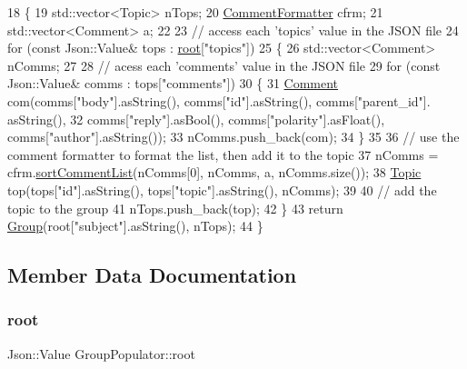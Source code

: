 \begin{DoxyCode}
18 \{
19     std::vector<Topic> nTops;
20     \hyperlink{class_comment_formatter}{CommentFormatter} cfrm;
21     std::vector<Comment> a;
22 
23     \textcolor{comment}{// access each 'topics' value in the JSON file}
24     \textcolor{keywordflow}{for} (\textcolor{keyword}{const} Json::Value& tops : \hyperlink{class_group_populator_a161f0427ec538d3a99da2e53fdbc9b2b}{root}[\textcolor{stringliteral}{"topics"}])
25     \{
26         std::vector<Comment> nComms;
27 
28         \textcolor{comment}{// acess each 'comments' value in the JSON file}
29         \textcolor{keywordflow}{for} (\textcolor{keyword}{const} Json::Value& comms : tops[\textcolor{stringliteral}{"comments"}])
30         \{
31             \hyperlink{class_comment}{Comment} com(comms[\textcolor{stringliteral}{"body"}].asString(), comms[\textcolor{stringliteral}{"id"}].asString(), comms[\textcolor{stringliteral}{"parent\_id"}].
      asString(), 
32                 comms[\textcolor{stringliteral}{"reply"}].asBool(), comms[\textcolor{stringliteral}{"polarity"}].asFloat(), comms[\textcolor{stringliteral}{"author"}].asString());
33             nComms.push\_back(com);
34         \}
35 
36         \textcolor{comment}{// use the comment formatter to format the list, then add it to the topic}
37         nComms = cfrm.\hyperlink{class_comment_formatter_a6a9af9cdde666a914d97c3f45e6c8a49}{sortCommentList}(nComms[0], nComms, a, nComms.size());
38         \hyperlink{class_topic}{Topic} top(tops[\textcolor{stringliteral}{"id"}].asString(), tops[\textcolor{stringliteral}{"topic"}].asString(), nComms);
39 
40         \textcolor{comment}{// add the topic to the group}
41         nTops.push\_back(top);
42     \}
43     \textcolor{keywordflow}{return} \hyperlink{class_group}{Group}(root[\textcolor{stringliteral}{"subject"}].asString(), nTops);
44 \}
\end{DoxyCode}


\subsection{Member Data Documentation}
\mbox{\label{class_group_populator_a161f0427ec538d3a99da2e53fdbc9b2b}} 
\subsubsection{\texorpdfstring{root}{root}}
{\footnotesize\ttfamily Json\+::\+Value Group\+Populator\+::root\hspace{0.3cm}{\ttfamily [private]}}



